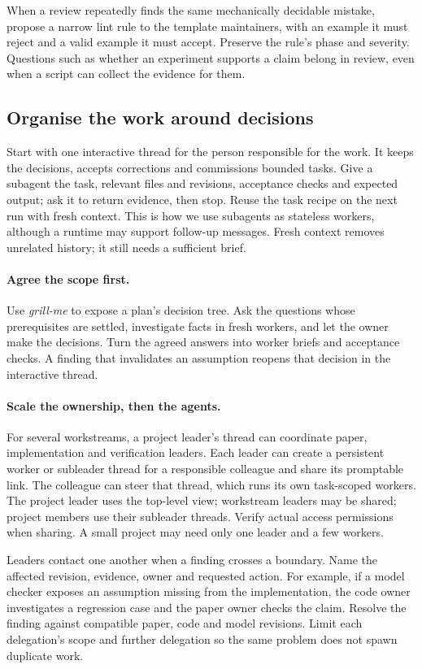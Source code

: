 When a review repeatedly finds the same mechanically decidable mistake, propose a narrow lint rule to the template maintainers, with an example it must reject and a valid example it must accept. Preserve the rule's phase and severity. Questions such as whether an experiment supports a claim belong in review, even when a script can collect the evidence for them.

\subsection{Organise the work around decisions}\label{app:code:orchestration}
Start with one interactive thread for the person responsible for the work. It keeps the decisions, accepts corrections and commissions bounded tasks. Give a subagent the task, relevant files and revisions, acceptance checks and expected output; ask it to return evidence, then stop. Reuse the task recipe on the next run with fresh context. This is how we use subagents as stateless workers, although a runtime may support follow-up messages. Fresh context removes unrelated history; it still needs a sufficient brief.

\paragraph{Agree the scope first.} Use \emph{grill-me} to expose a plan's decision tree. Ask the questions whose prerequisites are settled, investigate facts in fresh workers, and let the owner make the decisions. Turn the agreed answers into worker briefs and acceptance checks. A finding that invalidates an assumption reopens that decision in the interactive thread.

\paragraph{Scale the ownership, then the agents.} For several workstreams, a project leader's thread can coordinate paper, implementation and verification leaders. Each leader can create a persistent worker or subleader thread for a responsible colleague and share its promptable link. The colleague can steer that thread, which runs its own task-scoped workers. The project leader uses the top-level view; workstream leaders may be shared; project members use their subleader threads. Verify actual access permissions when sharing. A small project may need only one leader and a few workers.

Leaders contact one another when a finding crosses a boundary. Name the affected revision, evidence, owner and requested action. For example, if a model checker exposes an assumption missing from the implementation, the code owner investigates a regression case and the paper owner checks the claim. Resolve the finding against compatible paper, code and model revisions. Limit each delegation's scope and further delegation so the same problem does not spawn duplicate work.


